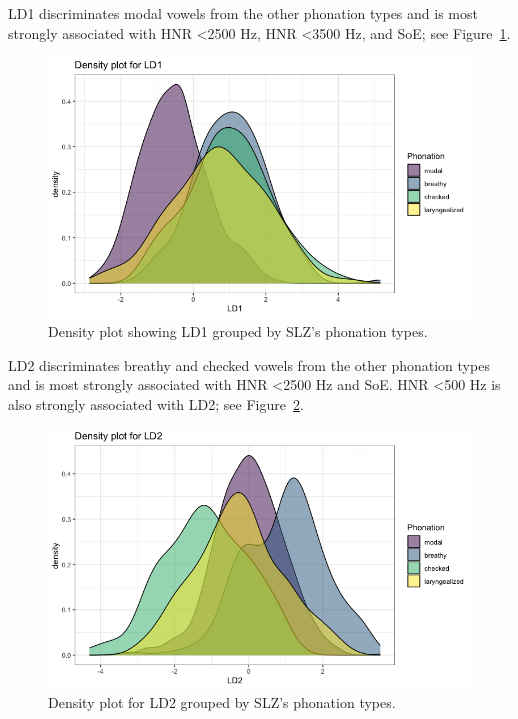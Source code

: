 \documentclass[12pt, letterpaper]{article}
\begin{document}
LD1 discriminates modal vowels from the other phonation types and is most strongly associated with HNR \textless 2500 Hz, HNR \textless 3500 Hz, and SoE; see Figure~\ref{fig:LD1}. 
\begin{figure}[!h]
    \centering
    \includegraphics[width=.75\linewidth]{Images/ld1_density.png}
    \caption{Density plot showing LD1 grouped by SLZ's phonation types.}
    \label{fig:LD1}
\end{figure}

LD2 discriminates breathy and checked vowels from the other phonation types and is most strongly associated with HNR \textless 2500 Hz and SoE. HNR \textless 500 Hz is also strongly associated with LD2; see Figure~\ref*{fig:LD2}. 
\begin{figure}[!h]
    \centering
    \includegraphics[width=.75\linewidth]{Images/ld2_density.png}
    \caption{Density plot for LD2 grouped by SLZ's phonation types.}
    \label{fig:LD2}
\end{figure}
\end{document}
